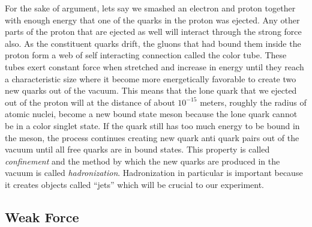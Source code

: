 For the sake of argument, lets say we smashed an electron and proton together with enough energy that one of the quarks in the proton was ejected.
Any other parts of the proton that are ejected as well will interact through the strong force also. As the constituent quarks drift, the gluons that had bound them inside the proton form a web of self interacting connection called the color tube.
These tubes exert constant force when stretched and increase in energy until they reach a characteristic size where it become more energetically favorable to create two new quarks out of the vacuum.
This means that the lone quark that we ejected out of the proton will at the distance of about $10^{-15}$ meters, roughly the radius of atomic nuclei, become a new bound state meson because the lone quark cannot be in a color singlet state. 
If the quark still has too much energy to be bound in the meson, the process continues creating new quark anti quark pairs out of the vacuum until all free quarks are in bound states.
This property is called \textit{confinement} and the method by which the new quarks are produced in the vacuum is called \textit{hadronization}. 
Hadronization in particular is important because it creates objects called ``jets'' which will be crucial to our experiment.


\subsection{Weak Force}

